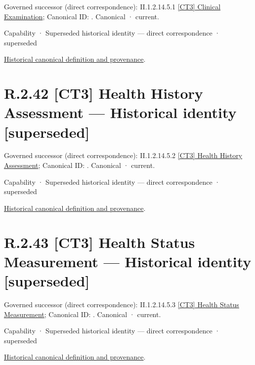 {\small Governed successor (direct correspondence): II.1.2.14.5.1 \hyperref[element:8855d4d9e2954e0ab66ab65a556fc61a]{[CT3] Clinical Examination}; Canonical ID: \texttt{}. Canonical · current.}\par
\label{element:8bc15e2b8f114deebcbbe3f2013a8147}
{\small Capability · Superseded historical identity — direct correspondence · superseded}\par
\href{../../../../continuum/strategy/capability/8bc15e2b8f114deebcbbe3f2013a8147.md}{Historical canonical definition and provenance}.\par
\section*{R.2.42 [CT3] Health History Assessment — Historical identity [superseded]}
\label{navigation:R.2.42}

{\small Governed successor (direct correspondence): II.1.2.14.5.2 \hyperref[element:7ea7e3f74e2940a7934b588a1a038834]{[CT3] Health History Assessment}; Canonical ID: \texttt{}. Canonical · current.}\par
\label{element:bcaacf446f45443eafd8e21a1fd74ee1}
{\small Capability · Superseded historical identity — direct correspondence · superseded}\par
\href{../../../../continuum/strategy/capability/bcaacf446f45443eafd8e21a1fd74ee1.md}{Historical canonical definition and provenance}.\par
\section*{R.2.43 [CT3] Health Status Measurement — Historical identity [superseded]}
\label{navigation:R.2.43}

{\small Governed successor (direct correspondence): II.1.2.14.5.3 \hyperref[element:a796bfb3335d44f6aeb9970628ed8554]{[CT3] Health Status Measurement}; Canonical ID: \texttt{}. Canonical · current.}\par
\label{element:3717906f7f8840d3a8a3e3877543dd18}
{\small Capability · Superseded historical identity — direct correspondence · superseded}\par
\href{../../../../continuum/strategy/capability/3717906f7f8840d3a8a3e3877543dd18.md}{Historical canonical definition and provenance}.\par
